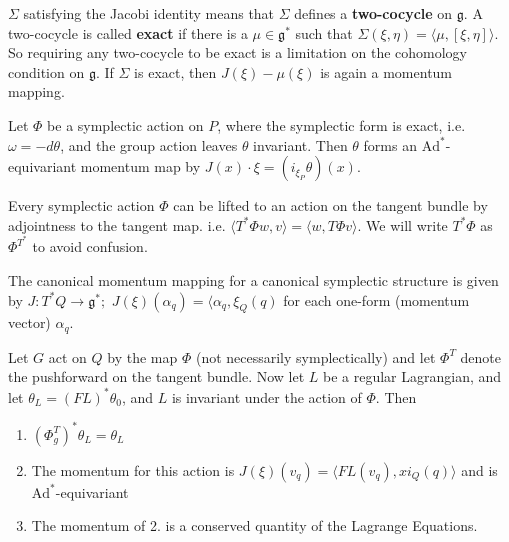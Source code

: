 \indent $\Sigma$ satisfying the Jacobi identity means that $\Sigma$ defines a \textbf{two-cocycle} on $\mathfrak{g}$. A two-cocycle is called \textbf{exact} if there is a $\mu \in \mathfrak{g}^*$ such that $\Sigma(\xi, \eta) = \langle \mu, [\xi, \eta] \rangle$. So requiring any two-cocycle to be exact is a limitation on the cohomology condition on $\mathfrak{g}$. If $\Sigma$ is exact, then $J(\xi) - \mu(\xi)$ is again a momentum mapping. 

\begin{thm}

Let $\Phi$ be a symplectic action on $P$, where the symplectic form is exact, i.e. $\omega = - d\theta$, and the group action leaves $\theta$ invariant. Then $\theta$ forms an $\mathrm{Ad}^*$-equivariant momentum map by $J(x) \cdot \xi = (i_{\xi_P} \theta)(x)$.

\end{thm}

Every symplectic action $\Phi$ can be lifted to an action on the tangent bundle by adjointness to the tangent map. i.e. $\langle T^* \Phi w, v \rangle = \langle w, T\Phi v \rangle$. We will write $T^*\Phi$ as $\Phi^{T^*}$ to avoid confusion.

\begin{cor}

The canonical momentum mapping for a canonical symplectic structure is given by $J: T^*Q \to \mathfrak{g}^*; \hspace{4pt} J(\xi)(\alpha_q) = \langle \alpha_q, \xi_Q(q) $ for each one-form (momentum vector) $\alpha_q$.
\end{cor}

\begin{cor}

Let $G$ act on $Q$ by the map $\Phi$ (not necessarily symplectically) and let $\Phi^T$ denote the pushforward on the tangent bundle. Now let $L$ be a regular Lagrangian, and let $\theta_L = (FL)^*\theta_0$, and $L$ is invariant under the action of $\Phi$. Then

\begin{enumerate}
    \item $(\Phi^T_g)^* \theta_L = \theta_L $
    \item The momentum for this action is $J(\xi)(v_q) = \langle FL(v_q), xi_Q(q) \rangle$ and is $\mathrm{Ad}^*$-equivariant
    \item The momentum of 2. is a conserved quantity of the Lagrange Equations.
    
\end{enumerate}

\end{cor}


